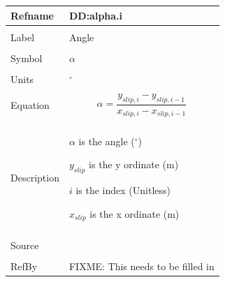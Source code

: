 \documentclass[12pt]{article}
\begin{document}
\noindent \begin{minipage}{\textwidth}
\begin{tabular}{p{} p{}}
\toprule \textbf{Refname} & \textbf{DD:alpha.i}
\label{DD:alpha.i}
\\ \midrule \\
Label & Angle
\\ \midrule \\
Symbol & $α$
\\ \midrule \\
Units & ${}^{\circ}$
\\ \midrule \\
Equation & \begin{dmath}
           α=\frac{{y_{slip,i}}-{y_{slip,i-1}}}{{x_{slip,i}}-{x_{slip,i-1}}}
           \end{dmath}
\\ \midrule \\
Description & \begin{symbDescription}
              \item{$α$ is the angle (${}^{\circ}$)}
              \item{${y_{slip}}$ is the y ordinate (m)}
              \item{$i$ is the index (Unitless)}
              \item{${x_{slip}}$ is the x ordinate (m)}
              \end{symbDescription}
\\ \midrule \\
Source & 
\\ \midrule \\
RefBy & FIXME: This needs to be filled in
\\ \bottomrule \end{tabular}
\end{minipage}\\
~\newline
\end{document}
